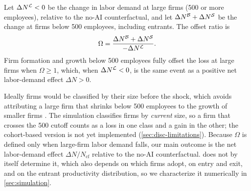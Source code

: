 \begin{definition}\label{def:offset}
Let $\Delta N^{\mathcal{L}} < 0$ be the change in labor demand at large firms (500 or more employees), relative to the no-AI counterfactual, and let $\Delta N^{\mathcal{B}} + \Delta N^{\mathcal{S}}$ be the change at firms below 500 employees, including entrants.
The offset ratio is
\begin{equation}\label{eq:offset-ratio}
  \Omega = \frac{\Delta N^{\mathcal{B}} + \Delta N^{\mathcal{S}}}{-\Delta N^{\mathcal{L}}} .
\end{equation}
Firm formation and growth below 500 employees fully offset the loss at large firms when $\Omega \ge 1$, which, when $\Delta N^{\mathcal{L}} < 0$, is the same event as a positive net labor-demand effect $\Delta N > 0$.
\end{definition}

\noindent
Ideally firms would be classified by their size before the shock, which avoids attributing a large firm that shrinks below 500 employees to the growth of smaller firms \citep[see the discussion of size classification in][]{haltiwanger2013who}.
The simulation classifies firms by \emph{current} size, so a firm that crosses the 500 cutoff counts as a loss in one class and a gain in the other; the cohort-based version is not yet implemented (\cref{sec:disc-limitations}).
Because $\Omega$ is defined only when large-firm labor demand falls, our main outcome is the net labor-demand effect $\Delta N / N_{\text{cf}}$ relative to the no-AI counterfactual.
 does not by itself determine it, which also depends on which firms adopt, on entry and exit, and on the entrant productivity distribution, so we characterize it numerically in \cref{sec:simulation}.
